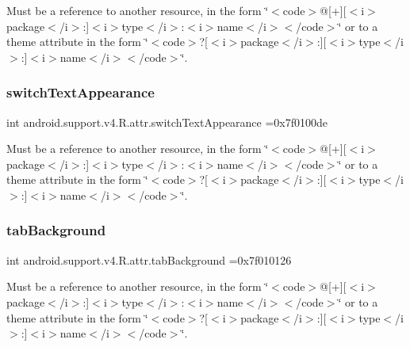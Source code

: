 Must be a reference to another resource, in the form \char`\"{}$<$code$>$@\mbox{[}+\mbox{]}\mbox{[}$<$i$>$package$<$/i$>$\+:\mbox{]}$<$i$>$type$<$/i$>$\+:$<$i$>$name$<$/i$>$$<$/code$>$\char`\"{} or to a theme attribute in the form \char`\"{}$<$code$>$?\mbox{[}$<$i$>$package$<$/i$>$\+:\mbox{]}\mbox{[}$<$i$>$type$<$/i$>$\+:\mbox{]}$<$i$>$name$<$/i$>$$<$/code$>$\char`\"{}. \mbox{\label{classandroid_1_1support_1_1v4_1_1R_1_1attr_a1b21b5a978f7e9880ff0cb866c5c1225}} 
\subsubsection{\texorpdfstring{switch\+Text\+Appearance}{switchTextAppearance}}
{\footnotesize\ttfamily int android.\+support.\+v4.\+R.\+attr.\+switch\+Text\+Appearance =0x7f0100de\hspace{0.3cm}{\ttfamily [static]}}

Must be a reference to another resource, in the form \char`\"{}$<$code$>$@\mbox{[}+\mbox{]}\mbox{[}$<$i$>$package$<$/i$>$\+:\mbox{]}$<$i$>$type$<$/i$>$\+:$<$i$>$name$<$/i$>$$<$/code$>$\char`\"{} or to a theme attribute in the form \char`\"{}$<$code$>$?\mbox{[}$<$i$>$package$<$/i$>$\+:\mbox{]}\mbox{[}$<$i$>$type$<$/i$>$\+:\mbox{]}$<$i$>$name$<$/i$>$$<$/code$>$\char`\"{}. \mbox{\label{classandroid_1_1support_1_1v4_1_1R_1_1attr_aaa4e3120a1afbdbe6b11c73e2c22da5c}} 
\subsubsection{\texorpdfstring{tab\+Background}{tabBackground}}
{\footnotesize\ttfamily int android.\+support.\+v4.\+R.\+attr.\+tab\+Background =0x7f010126\hspace{0.3cm}{\ttfamily [static]}}

Must be a reference to another resource, in the form \char`\"{}$<$code$>$@\mbox{[}+\mbox{]}\mbox{[}$<$i$>$package$<$/i$>$\+:\mbox{]}$<$i$>$type$<$/i$>$\+:$<$i$>$name$<$/i$>$$<$/code$>$\char`\"{} or to a theme attribute in the form \char`\"{}$<$code$>$?\mbox{[}$<$i$>$package$<$/i$>$\+:\mbox{]}\mbox{[}$<$i$>$type$<$/i$>$\+:\mbox{]}$<$i$>$name$<$/i$>$$<$/code$>$\char`\"{}. \mbox{\label{classandroid_1_1support_1_1v4_1_1R_1_1attr_ac204edcd2e822d7fbf8758c3d7ebd316}} 
